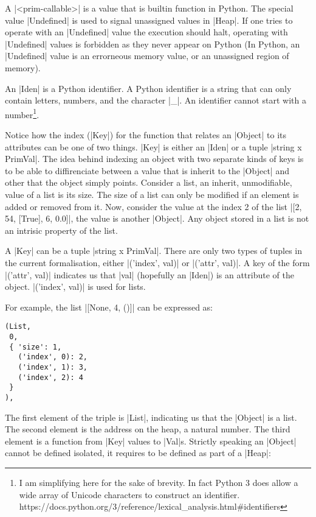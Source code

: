 A \pycode|<prim-callable>| is a value that is
builtin function in Python. The special value \pycode|Undefined| is used
to signal unassigned values in \pycode|Heap|. If one tries to operate
with an \pycode|Undefined| value the execution should halt, operating
with \pycode|Undefined| values is forbidden as they never appear on
Python (In Python, an \pycode|Undefined| value is an errorneous memory
value, or an unassigned region of memory).

An \pycode|Iden| is a Python identifier. A Python identifier is a string
that can only contain letters, numbers, and the character \pycode|_|.
An identifier cannot start with a number\footnote{I am simplifying here
  for the sake of brevity. In fact Python 3 does allow a wide array of
  Unicode characters to construct an identifier.
  https://docs.python.org/3/reference/lexical\_analysis.html\#identifiers}.

Notice how the index (\pycode|Key|) for the function that relates an
\pycode|Object| to its attributes can be one of two things. \pycode|Key|
is either an \pycode|Iden| or a tuple \pycode|string x PrimVal|. The
idea behind indexing an object with two separate kinds of keys is to be
able to diffirenciate between a value that is inherit to the
\pycode|Object| and other that the object simply points. Consider a
list, an inherit, unmodifiable, value of a list is its size. The size of
a list can only be modified if an element is added or removed from it.
Now, consider the value at the index 2 of the list
\pycode|[2, 54, [True], 6, 0.0]|, the value is another
\pycode|Object|. Any object stored in a list is not an intrisic property
of the list.

A \pycode|Key| can be a tuple \pycode|string x PrimVal|. There are
only two types of tuples in the current formalisation, either
\pycode|('index', val)| or
\pycode|('attr', val)|. A key of the
form \pycode|('attr', val)| indicates
us that \pycode|val| (hopefully an \pycode|Iden|) is an attribute of the
object. \pycode|('index', val)| is
used for lists.

For example, the list \pycode|[None, 4, ()]| can be expressed as:

\begin{verbatim}
(List,
 0,
 { 'size': 1,
   ('index', 0): 2,
   ('index', 1): 3,
   ('index', 2): 4
 }
),
\end{verbatim}

The first element of the triple is \pycode|List|, indicating us that the
\pycode|Object| is a list. The second element is the address on the
heap, a natural number. The third element is a function from
\pycode|Key| values to \pycode|Val|s. Strictly speaking an
\pycode|Object| cannot be defined isolated, it requires to be defined as
part of a \pycode|Heap|:

